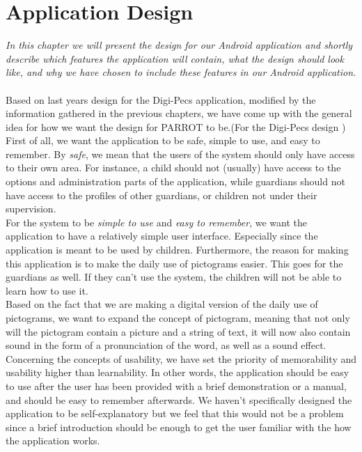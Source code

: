 \chapter{Application Design}
\label{appd}
\textit{In this chapter we will present the design for our Android application and shortly describe which features the application will contain, what the design should look like, and why we have chosen to include these features in our Android application.}\\
\label{appdes}
\\
Based on last years design for the Digi-Pecs application, modified by the information gathered in the previous chapters, we have come up with the general idea for how we want the design for PARROT to be.(For the Digi-Pecs design \cite{digipecs} )\newline
First of all, we want the application to be safe, simple to use, and easy to remember.\newline
By \textit{safe}, we mean that the users of the system should only have access to their own area. For instance, a child should not (usually) have access to the options and administration parts of the application, while guardians should not have access to the profiles of other guardians, or children not under their supervision.\newline
\\
For the system to be \textit{simple to use} and \textit{easy to remember}, we want the application to have a relatively simple user interface. Especially since the application is meant to be used by children. Furthermore, the reason for making this application is to make the daily use of pictograms easier. This goes for the guardians as well. If they can't use the system, the children will not be able to learn how to use it.\newline
\\
Based on the fact that we are making a digital version of the daily use of pictograms, we want to expand the concept of pictogram, meaning that not only will the pictogram contain a picture and a string of text, it will now also contain sound in the form of a pronunciation of the word, as well as a sound effect.
Concerning the concepts of usability, we have set the priority of memorability and usability higher than learnability. In other words, the application should be easy to use after the user has been provided with a brief demonstration or a manual, and should be easy to remember afterwards. We haven't specifically designed the application to be self-explanatory but we feel that this would not be a problem since a brief introduction should be enough to get the user familiar with the how the application works.    


